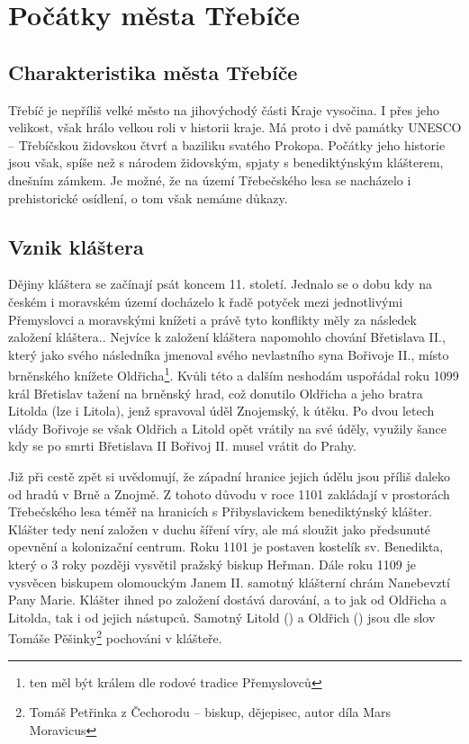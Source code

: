 \documentclass[a4paper,oneside,12p]{report}
\begin{document}


\tableofcontents
\newpage
{}
\setcounter{page}{1}




\chapter{Počátky města Třebíče}

\section{Charakteristika města Třebíče}

Třebíč je nepříliš velké město na jihovýchodý části Kraje vysočina.
I přes jeho velikost, však hrálo velkou roli v historii kraje.
Má proto i dvě památky UNESCO -- Třebíčskou židovskou čtvrť a baziliku svatého Prokopa.
Počátky jeho historie jsou však, spíše než s národem židovským, spjaty s benediktýnským klášterem, dnešním zámkem.
Je možné, že na území Třebečského lesa se nacházelo i prehistorické osídlení, o tom však nemáme důkazy.

\section{Vznik kláštera}

Dějiny kláštera se začínají psát koncem 11. století.
Jednalo se o dobu kdy na českém i moravském území docházelo k řadě potyček mezi jednotlivými Přemyslovci a moravskými knížeti a právě tyto konflikty měly za následek založení kláštera..
Nejvíce k založení kláštera napomohlo chování Břetislava II., který jako svého následníka jmenoval svého nevlastního syna Bořivoje II., místo brněnského knížete Oldřicha\footnote{ten měl být králem dle rodové tradice Přemyslovců}.
Kvůli této a dalším neshodám uspořádal roku 1099 král Břetislav tažení na brněnský hrad, což donutilo Oldřicha a jeho bratra Litolda (lze i Litola), jenž spravoval úděl Znojemský, k útěku.
Po dvou letech vlády Bořivoje se však Oldřich a Litold opět vrátily na své úděly, využily šance kdy se po smrti Břetislava II Bořivoj II. musel vrátit do Prahy.

Již při cestě zpět si uvědomují, že západní hranice jejich údělu jsou příliš daleko od hradů v Brně a Znojmě.
Z tohoto důvodu v roce 1101 zakládají v prostorách Třebečského lesa téměř na hranicích s Přibyslavickem benediktýnský klášter.
Klášter tedy není založen v duchu šíření víry, ale má sloužit jako předsunuté opevnění a kolonizační centrum.
Roku 1101 je postaven kostelík sv. Benedikta, který o 3 roky později vysvětil pražský biskup Heřman.
Dále roku 1109 je vysvěcen biskupem olomouckým Janem II. samotný klášterní chrám Nanebevztí Pany Marie.
Klášter ihned po založení dostává darování, a to jak od Oldřicha a Litolda, tak i od jejich nástupců.
Samotný Litold () a Oldřich () jsou dle slov Tomáše Pěšinky\footnote{Tomáš Petřinka z Čechorodu -- biskup, dějepisec, autor díla Mars Moravicus} pochováni v klášteře.
\end{document}
